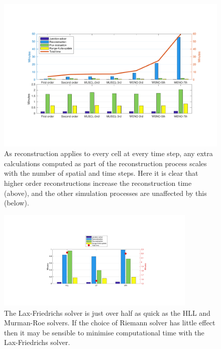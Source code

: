 	\begin{figure}
    		\centering
        		\includegraphics[trim=80 100 60 90,clip,width=\textwidth]{Time_M1J40_reco.pdf}
		\caption[Time Analysis : M1J40 reconstruction]{As reconstruction applies to every cell at every time step, any extra calculations computed as part of the reconstruction process scales with the number of spatial and time steps. Here it is clear that higher order reconstructions increase the reconstruction time (above), and the other simulation processes are unaffected by this (below). }
		\label{fig:randd:Time:M1J40_reco}
	\end{figure}
	
	\begin{figure}
    		\centering
        		\includegraphics[trim=230 110 210 110,clip,width=0.85\textwidth]{Time_ReDiRoma_riem.pdf}
		\caption[Time Analysis : Re Di Roma Riemann solvers]{The Lax-Friedrichs solver is just over half as quick as the HLL and Murman-Roe solvers. If the choice of Riemann solver has little effect then it may be sensible to minimise computational time with the Lax-Friedrichs solver. }
		\label{fig:randd:Time:ReDiRoma:riem}
	\end{figure}
	
